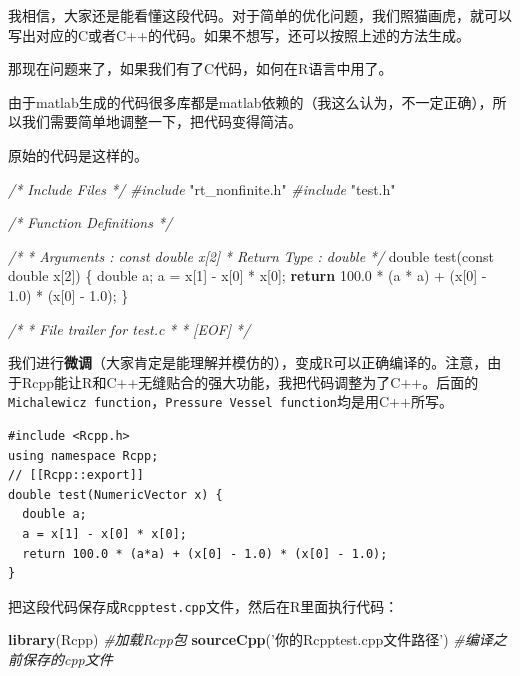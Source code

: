 \documentclass[]{ctexbook}
\newenvironment{Shaded}{\begin{snugshade}}{\end{snugshade}}
\newcommand{\KeywordTok}[1]{\textcolor[rgb]{0.13,0.29,0.53}{\textbf{#1}}}
\newcommand{\DataTypeTok}[1]{\textcolor[rgb]{0.13,0.29,0.53}{#1}}
\newcommand{\DecValTok}[1]{\textcolor[rgb]{0.00,0.00,0.81}{#1}}
\newcommand{\FloatTok}[1]{\textcolor[rgb]{0.00,0.00,0.81}{#1}}
\newcommand{\StringTok}[1]{\textcolor[rgb]{0.31,0.60,0.02}{#1}}
\newcommand{\ImportTok}[1]{#1}
\newcommand{\CommentTok}[1]{\textcolor[rgb]{0.56,0.35,0.01}{\textit{#1}}}
\newcommand{\ControlFlowTok}[1]{\textcolor[rgb]{0.13,0.29,0.53}{\textbf{#1}}}
\newcommand{\PreprocessorTok}[1]{\textcolor[rgb]{0.56,0.35,0.01}{\textit{#1}}}
\newcommand{\NormalTok}[1]{#1}
\begin{document}
我相信，大家还是能看懂这段代码。对于简单的优化问题，我们照猫画虎，就可以写出对应的C或者C++的代码。如果不想写，还可以按照上述的方法生成。

那现在问题来了，如果我们有了C代码，如何在R语言中用了。

由于matlab生成的代码很多库都是matlab依赖的（我这么认为，不一定正确），所以我们需要简单地调整一下，把代码变得简洁。

原始的代码是这样的。

\begin{Shaded}
\begin{Highlighting}[]
\CommentTok{/* Include Files */}
\PreprocessorTok{#include }\ImportTok{"rt_nonfinite.h"}
\PreprocessorTok{#include }\ImportTok{"test.h"}

\CommentTok{/* Function Definitions */}

\CommentTok{/*}
\CommentTok{ * Arguments    : const double x[2]}
\CommentTok{ * Return Type  : double}
\CommentTok{ */}
\DataTypeTok{double}\NormalTok{ test(}\DataTypeTok{const} \DataTypeTok{double}\NormalTok{ x[}\DecValTok{2}\NormalTok{])}
\NormalTok{\{}
  \DataTypeTok{double}\NormalTok{ a;}
\NormalTok{  a = x[}\DecValTok{1}\NormalTok{] - x[}\DecValTok{0}\NormalTok{] * x[}\DecValTok{0}\NormalTok{];}
  \ControlFlowTok{return} \FloatTok{100.0}\NormalTok{ * (a * a) + (x[}\DecValTok{0}\NormalTok{] - }\FloatTok{1.0}\NormalTok{) * (x[}\DecValTok{0}\NormalTok{] - }\FloatTok{1.0}\NormalTok{);}
\NormalTok{\}}

\CommentTok{/*}
\CommentTok{ * File trailer for test.c}
\CommentTok{ *}
\CommentTok{ * [EOF]}
\CommentTok{ */}
\end{Highlighting}
\end{Shaded}

我们进行\textbf{微调}（大家肯定是能理解并模仿的），变成R可以正确编译的。注意，由于Rcpp能让R和C++无缝贴合的强大功能，我把代码调整为了C++。后面的\texttt{Michalewicz\ function}，\texttt{Pressure\ Vessel\ function}均是用C++所写。

\begin{verbatim}
#include <Rcpp.h>
using namespace Rcpp;
// [[Rcpp::export]]
double test(NumericVector x) {
  double a;
  a = x[1] - x[0] * x[0];
  return 100.0 * (a*a) + (x[0] - 1.0) * (x[0] - 1.0);
}
\end{verbatim}

把这段代码保存成\texttt{Rcpptest.cpp}文件，然后在R里面执行代码：

\begin{Shaded}
\begin{Highlighting}[]
\KeywordTok{library}\NormalTok{(Rcpp) }\CommentTok{#加载Rcpp包}
\KeywordTok{sourceCpp}\NormalTok{(}\StringTok{'你的Rcpptest.cpp文件路径'}\NormalTok{) }\CommentTok{#编译之前保存的cpp文件}
\end{Highlighting}
\end{Shaded}
\end{document}
